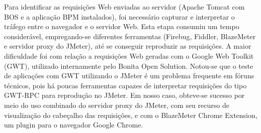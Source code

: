 \documentclass[12pt]{article}
\begin{document}
Para identificar as requisições Web enviadas ao servidor (Apache Tomcat com BOS e a aplicação BPM instalados), foi necessário capturar e interpretar o tráfego entre o navegador e o servidor Web. Esta etapa consumiu um tempo considerável, empregando-se diferentes ferramentas (Firebug, Fiddler, BlazeMeter e servidor proxy do JMeter), até se conseguir reproduzir as requisições. A maior dificuldade foi com relação a requisições Web geradas com o Google Web Toolkit (GWT), utilizado internamente pelo Bonita Open Solution.
Notou-se que o teste de aplicações com GWT utilizando o JMeter é um problema frequente em fóruns técnicos, pois há poucas ferramentas capazes de interpretar requisições do tipo GWT-RPC para reprodução no JMeter. Em nosso caso, obteve-se sucesso por meio do uso combinado do servidor proxy do JMeter, com seu recurso de visualização do cabeçalho das requisições, e com o BlazeMeter Chrome Extension, um plugin para o navegador Google Chrome.







\end{document}
